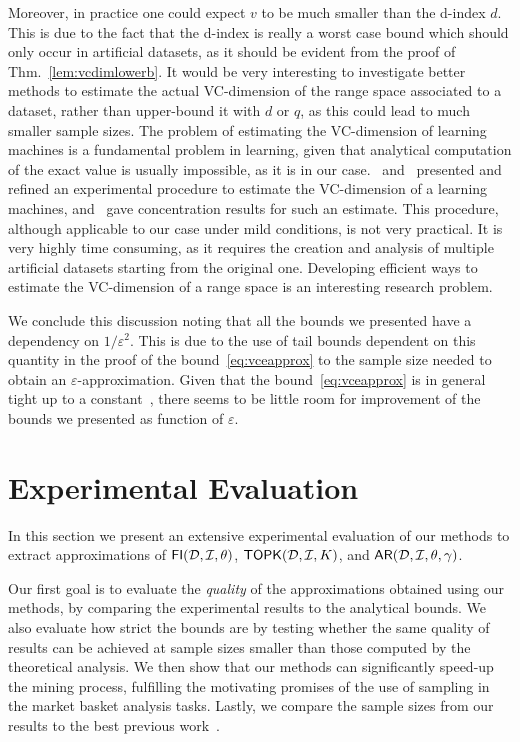 Moreover, in practice one could expect $v$ to be much smaller than the d-index
$d$. This is due to the fact that the d-index is really a worst case bound which
should only occur in artificial datasets, as it should be evident from the
proof of Thm.~\ref{lem:vcdimlowerb}. It would be very interesting to investigate
better methods to estimate the actual VC-dimension of the range space associated
to a dataset, rather than upper-bound it with $d$ or $q$, as this could lead to
much smaller sample sizes. The problem of estimating the VC-dimension of
learning machines is a fundamental problem in learning, given that analytical
computation of the exact value is usually impossible, as it is in our
case. \citet{VapnikLLC94}~and~\citet{ShaoCL00} presented and refined an
experimental procedure to estimate the VC-dimension of a learning machines,
and~\citet{McDonaldSS11} gave concentration results for such an estimate. This
procedure, although applicable to our case under mild conditions, is not very
practical. It is very highly time consuming, as it requires the creation and
analysis of multiple artificial datasets starting from the original one.
Developing efficient ways to estimate the VC-dimension of a range space is
an interesting research problem. 

We conclude this discussion noting that all the bounds we presented have a
dependency on $1/\varepsilon^2$. This is due to the use of tail bounds dependent
on this quantity in the proof of the bound~\eqref{eq:vceapprox} to the sample size
needed to obtain an $\varepsilon$-approximation. Given that the
bound~\eqref{eq:vceapprox} is in general tight up to a constant~\citep{LiLS01},
there seems to be little room for improvement of the bounds we presented as
function of $\varepsilon$.

\section{Experimental Evaluation}\label{sec:vcmineexp}
In this section we present an extensive experimental evaluation of
our methods to extract approximations of $\mathsf{FI}({\cal D},{\cal I},\theta)$, $\mathsf{TOPK}({\cal D},{\cal I},K)$, and
$\mathsf{AR}({\cal D},{\cal I},\theta,\gamma)$.

Our first goal is to evaluate the \emph{quality} of the
approximations obtained using our methods, by comparing the experimental results 
to the analytical bounds. We also evaluate how strict the bounds are
 by testing whether the same quality of results can be
achieved at sample sizes smaller than those computed by the theoretical analysis. 
We then show that our methods can significantly speed-up the mining process,
fulfilling the motivating promises of the use of sampling in the market basket
analysis tasks. Lastly, we compare the sample sizes from our results to the best
previous work~\citep{ChakaravarthyPS09}.

